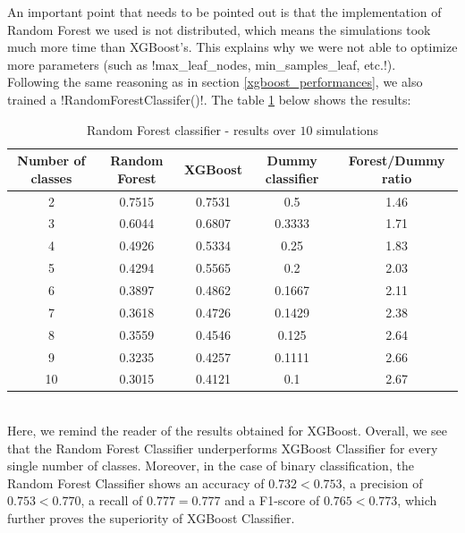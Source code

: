 \documentclass[]{article}
\begin{document}
\noindent
An important point that needs to be pointed out is that the \sklearn implementation of Random Forest we used is not distributed, which means the simulations took much more time than XGBoost's. This explains why we were not able to optimize more parameters (such as \pyth!max_leaf_nodes, min_samples_leaf, etc.!).\\

\noindent
Following the same reasoning as in section \ref{xgboost_performances}, we also trained a \pyth!RandomForestClassifer()!. The table \ref{results_randomForestClassifier} below shows the results:
\begin{table}[!h]
	\centering
	\begin{tabular}{|c|c|c|c|c|}
		\hline
		
		\textbf{Number of classes} & \textbf{Random Forest} & \textbf{XGBoost} & \textbf{Dummy classifier} & \textbf{Forest/Dummy ratio}\\
		\hline
		2 & 0.7515 & 0.7531 & 0.5 & 1.46\\
		\hline 
		3 & 0.6044 & 0.6807 & 0.3333 & 1.71\\
		\hline 
		4 & 0.4926 & 0.5334 & 0.25 &  1.83\\
		\hline 
		5 & 0.4294 & 0.5565 & 0.2 &  2.03\\
		\hline 
		6 & 0.3897 & 0.4862 & 0.1667 & 2.11\\
		\hline 
		7 & 0.3618 & 0.4726 & 0.1429 & 2.38\\
		\hline 
		8 & 0.3559 & 0.4546 & 0.125 & 2.64\\
		\hline 
		9 & 0.3235 & 0.4257 & 0.1111 &  2.66\\
		\hline 
		10 & 0.3015 & 0.4121 & 0.1 &  2.67\\
		\hline 
	\end{tabular}
	\caption{Random Forest classifier - results over $10$ simulations}
	\label{results_randomForestClassifier}
\end{table}\\
Here, we remind the reader of the results obtained for XGBoost. Overall, we see that the Random Forest Classifier underperforms XGBoost Classifier for every single number of classes. Moreover, in the case of binary classification, the Random Forest Classifier shows an accuracy of $0.732<0.753$, a precision of $0.753<0.770$, a recall of $0.777=0.777$ and a F1-score of $0.765<0.773$, which further proves the superiority of XGBoost Classifier.
\end{document}
